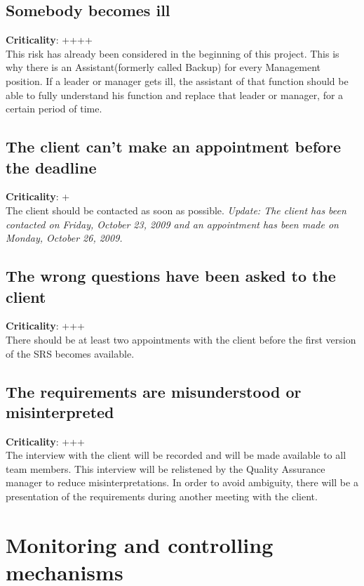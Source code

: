 \documentclass[a4paper, 12pt]{report}
\begin{document}
			\subsection{Somebody becomes ill}
			\textbf{Criticality}: ++++ \\
			This risk has already been considered in the beginning of this 
			project. This is why there is an Assistant(formerly called Backup) for 
			every Management position. If a leader or manager gets ill, the assistant 
			of that function should be able to fully understand his 
			function and replace that leader or manager, for a certain period of time.
			
			\subsection{The client can't make an appointment before the deadline}
			\textbf{Criticality}: + \\
			The client should be contacted as soon as possible. \emph{Update: The client has been
			contacted on Friday, October 23, 2009 and an appointment has been made on Monday,
			October 26, 2009.}
			
			\subsection{The wrong questions have been asked to the client}
			\textbf{Criticality}: +++ \\
			There should be at least two appointments with the client before the first version of
			the SRS becomes available.
			
			\subsection{The requirements are misunderstood or misinterpreted}
			\textbf{Criticality}: +++ \\
			The interview with the client will be recorded and will be made available to all team
			members. This interview will be relistened by the Quality Assurance manager to reduce
		 	misinterpretations. In order to avoid ambiguity, there will be a presentation of the
		 	requirements during another meeting with the client.			
				
		\section{Monitoring and controlling mechanisms}	
			
\end{document}
